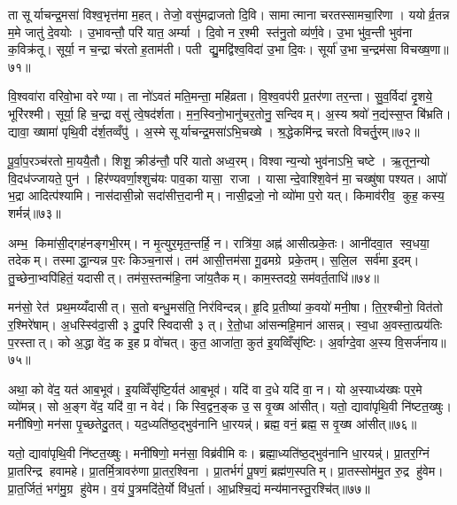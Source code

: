 ता सूर्याचन्द्र॒मसा॑ विश्व॒भृत्त॑मा म॒हत्। तेजो॒ वसु॑मद्राजतो दि॒वि। सामात्माना चरतस्सामचा॒रिणा। ययोर्व्र॒तन्न म॒मे जातु॑ दे॒वयोः। उ॒भावन्तौ॒ परि॑ यात॒ अर्म्या। दि॒वो न र॒श्मी स्त॑नु॒तो व्य॑र्ण॒वे। उ॒भा भु॑व॒न्ती भुव॑ना क॒विक्र॑तू। सूर्या॒ न च॒न्द्रा च॑रतो ह॒ताम॑ती। पती द्यु॒मद्वि॑श्व॒विदा॑ उ॒भा दि॒वः। सूर्या॑ उ॒भा च॒न्द्रम॑सा विचख्ष॒णा॥७१॥

वि॒श्ववा॑रा वरिवो॒भा वरेण्या। ता नो॑ऽवतं मति॒मन्ता॒ महि॑व्रता। वि॒श्व॒वप॑री प्र॒तर॑णा तर॒न्ता। सु॒व॒र्विदा॑ दृ॒शये॒ भूरि॑रश्मी। सूर्या॒ हि च॒न्द्रा वसु॑ त्वे॒षद॑र्शता। म॒न॒स्विनो॒भानु॑चर॒तोनु॒ सन्दिवम्। अ॒स्य श्रवो॑ न॒द्य॑स्स॒प्त बि॑भ्रति। द्यावा॒ ख्षामा॑ पृथि॒वी द॑र्\mbox{}श॒तव्वँपु॑। अ॒स्मे सूर्याचन्द्र॒मसा॑ऽभि॒चख्षे। श्र॒द्धेकमि॑न्द्र चरतो विचर्तु॒रम्॥७२॥

पू॒र्वा॒प॒रञ्च॑रतो मा॒ययै॒तौ। शिशू॒ क्रीड॑न्तौ॒ परि॑ यातो अध्व॒रम्। विश्वान्य॒न्यो भुव॑नाऽभि॒ चष्टे। ऋ॒तून॒न्यो वि॒दध॑ज्जायते॒ पुन॑। हिर॑ण्यवर्णा॒श्शुच॑यः पाव॒का यासा॒ राजा। यासान्दे॒वाश्शि॒वेन॑ मा॒ चख्षु॑षा पश्यत। आपो॑ भ॒द्रा आदित्प॑श्यामि। नास॑दासी॒न्नो सदा॑सीत्त॒दानीम्। नासी॒द्रजो॒ नो व्यो॑मा प॒रो यत्। किमाव॑रीव॒ कुह॒ कस्य॒ शर्मन्न्॑॥७३॥

अम्भ॒ किमा॑सी॒द्गह॑नङ्गभी॒रम्। न मृ॒त्युर॒मृत॒न्तर्\mbox{}हि॒ न। रात्रि॑या॒ अह्न॑ आसीत्प्रके॒तः। आनी॑दवा॒त स्व॒धया॒ तदेकम्। तस्माद्धा॒न्यन्न प॒रः किञ्च॒नास॑। तम॑ आसी॒त्तम॑सा गू॒ढमग्रे प्रके॒तम्। स॒लि॒ल सर्व॑मा इ॒दम्। तु॒च्छेना॒भ्वपि॑हितं॒ यदासीत्। तम॑स॒स्तन्म॑हि॒ना जा॑य॒तैकम्। काम॒स्तदग्रे॒ सम॑वर्त॒ताधि॑॥७४॥

मन॑सो॒ रेत॑ प्रथ॒मय्यँदासीत्। स॒तो बन्धु॒मस॑ति॒ निर॑विन्दन्न्। हृ॒दि प्र॒तीष्या॑ क॒वयो॑ मनी॒षा। ति॒र॒श्चीनो॒ वित॑तो र॒श्मिरे॑षाम्। अ॒धस्स्वि॑दा॒सी ३ दु॒परि॑ स्विदासी ३ त्। रे॒तो॒धा आ॑सन्महि॒मान॑ आसन्न्। स्व॒धा अ॒वस्ता॒त्प्रय॑तिः प॒रस्तात्। को अ॒द्धा वे॑द॒ क इ॒ह प्र वो॑चत्। कुत॒ आजा॑ता॒ कुत॑ इ॒यव्विँसृ॑ष्टिः। अ॒र्वाग्दे॒वा अ॒स्य वि॒सर्ज॑नाय॥७५॥

अथा॒ को वे॑द॒ यत॑ आब॒भूव॑। इ॒यव्विँसृ॑ष्टि॒र्यत॑ आब॒भूव॑। यदि॑ वा द॒धे यदि॑ वा॒ न। यो अ॒स्याध्य॑ख्षः पर॒मे व्यो॑मन्न्। सो अ॒ङ्ग वे॑द॒ यदि॑ वा॒ न वेद॑। किस्वि॒द्वन॒ङ्क उ॒ स वृ॒ख्ष आ॑सीत्। यतो॒ द्यावा॑पृथि॒वी नि॑ष्टत॒ख्षुः। मनी॑षिणो॒ मन॑सा पृ॒च्छतेदु॒तत्। यद॒ध्यति॑ष्ठ॒द्भुव॑नानि धा॒रयन्न्॑। ब्रह्म॒ वनं॒ ब्रह्म॒ स वृ॒ख्ष आ॑सीत्॥७६॥

यतो॒ द्यावा॑पृथि॒वी नि॑ष्टत॒ख्षुः। मनी॑षिणो॒ मन॑सा॒ विब्र॑वीमि वः। ब्रह्मा॒ध्यति॑ष्ठ॒द्भुव॑नानि धा॒रयन्न्॑। प्रा॒तर॒ग्निं प्रा॒तरिन्द्र हवामहे। प्रा॒तर्मि॒त्रावरु॑णा प्रा॒तर॒श्विना। प्रा॒तर्भगं॑ पू॒षणं॒ ब्रह्म॑ण॒स्पतिम्। प्रा॒तस्सोम॑मु॒त रु॒द्र हु॑वेम। प्रा॒त॒र्जितं॒ भग॑मु॒ग्र हु॑वेम। व॒यं पु॒त्रमदि॑ते॒र्यो वि॑ध॒र्ता। आ॒ध्रश्चि॒द्यं मन्य॑मानस्तु॒रश्चि॑त्॥७७॥

